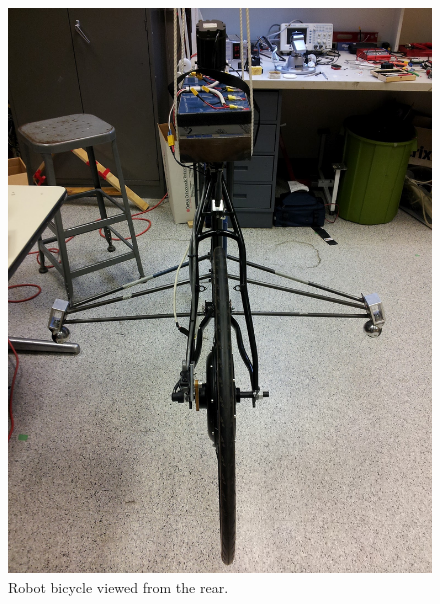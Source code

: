 \begin{figure}[htbp]
  \centering
  \includegraphics[width=\textwidth,angle=-90]{images/IMG_20120928_153405.jpg}
  \caption{Robot bicycle viewed from the rear.}
  \label{rb:img:rear}
\end{figure}
